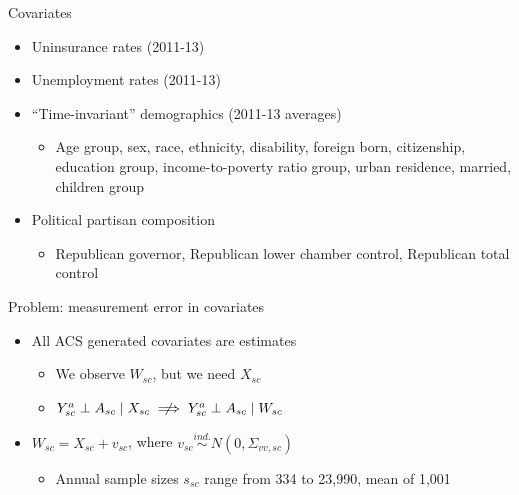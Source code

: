 \documentclass[hyperref={pdfpagelabels=false}]{beamer}
\begin{document}
\begin{frame}{Covariates}
\begin{itemize}
    \item Uninsurance rates (2011-13) \bigskip
    \item Unemployment rates (2011-13) \bigskip
    \item ``Time-invariant'' demographics (2011-13 averages) \bigskip
    \begin{itemize}
        \item Age group, sex, race, ethnicity, disability, foreign born, citizenship, education group, income-to-poverty ratio group, urban residence, married, children group \bigskip
    \end{itemize}
    \item Political partisan composition \bigskip
    \begin{itemize}
        \item Republican governor, Republican lower chamber control, Republican total control
    \end{itemize}
\end{itemize}
\end{frame}

\begin{frame}{Problem: measurement error in covariates}
    \begin{itemize}
        \item All ACS generated covariates are estimates \bigskip
        \begin{itemize}
            \item We observe $W_{sc}$, but we need $X_{sc}$ \bigskip
            \item $Y_{sc}^a \perp A_{sc} \mid X_{sc} \centernot\implies Y_{sc}^a \perp A_{sc} \mid W_{sc}$ \bigskip
        \end{itemize}
        \item $W_{sc} = X_{sc} + v_{sc}$, where $v_{sc} \stackrel{ind.}\sim N(0, \Sigma_{vv, sc})$ \bigskip
        \begin{itemize}
            \item Annual sample sizes $s_{sc}$ range from 334 to 23,990, mean of 1,001 \bigskip
        \end{itemize}
    \end{itemize}
\end{frame}
\end{document}
